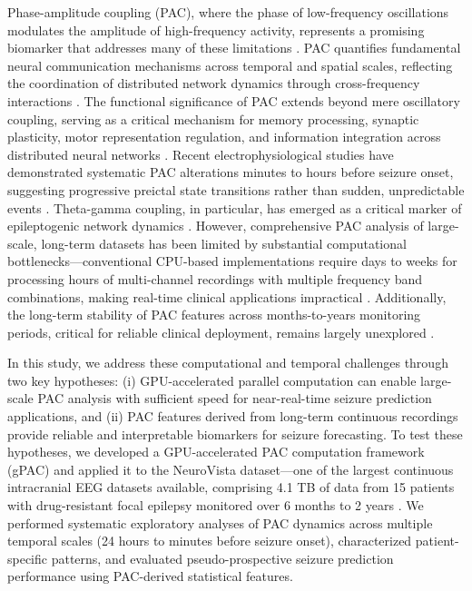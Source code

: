 Phase-amplitude coupling (PAC), where the phase of low-frequency oscillations modulates the amplitude of high-frequency activity, represents a promising biomarker that addresses many of these limitations \cite{Tort2010MeasuringPCE,Canolty2010TheFRC}. PAC quantifies fundamental neural communication mechanisms across temporal and spatial scales, reflecting the coordination of distributed network dynamics through cross-frequency interactions \cite{Aru2014UntanglingCCD,Hlsemann2019QuantificationOPA,Voytek2010ShiftsIGV}. The functional significance of PAC extends beyond mere oscillatory coupling, serving as a critical mechanism for memory processing, synaptic plasticity, motor representation regulation, and information integration across distributed neural networks \cite{Bergmann2018PhaseAmplitudeCAN,Onslow2014ACCAI,yanagisawa2012regulation}. Recent electrophysiological studies have demonstrated systematic PAC alterations minutes to hours before seizure onset, suggesting progressive preictal state transitions rather than sudden, unpredictable events \cite{Kapoor2022EpilepticSPJ,Detti2020EEGSAC,Zhang2017TemporalspatialCOAG,Miao2021SeizureOZBG,edakawa2016detection}. Theta-gamma coupling, in particular, has emerged as a critical marker of epileptogenic network dynamics \cite{Ahn2022TheFIT,Radiske2020CrossFrequencyPCAR,Ponzi2023ThetagammaPAAT}. However, comprehensive PAC analysis of large-scale, long-term datasets has been limited by substantial computational bottlenecks—conventional CPU-based implementations require days to weeks for processing hours of multi-channel recordings with multiple frequency band combinations, making real-time clinical applications impractical \cite{Combrisson2020TensorpacAOAH,MartnezCancino2020ComputingPABK}. Additionally, the long-term stability of PAC features across months-to-years monitoring periods, critical for reliable clinical deployment, remains largely unexplored \cite{Rakowska2021LongTEQ}.

In this study, we address these computational and temporal challenges through two key hypotheses: (i) GPU-accelerated parallel computation can enable large-scale PAC analysis with sufficient speed for near-real-time seizure prediction applications, and (ii) PAC features derived from long-term continuous recordings provide reliable and interpretable biomarkers for seizure forecasting. To test these hypotheses, we developed a GPU-accelerated PAC computation framework (gPAC) and applied it to the NeuroVista dataset—one of the largest continuous intracranial EEG datasets available, comprising 4.1 TB of data from 15 patients with drug-resistant focal epilepsy monitored over 6 months to 2 years \cite{Kuhlmann2018SeizurePA,kuhlmann2018epilepsyecosystem}. We performed systematic exploratory analyses of PAC dynamics across multiple temporal scales (24 hours to minutes before seizure onset), characterized patient-specific patterns, and evaluated pseudo-prospective seizure prediction performance using PAC-derived statistical features.

